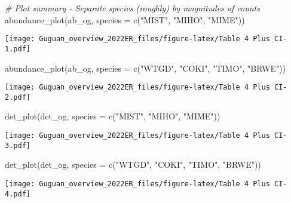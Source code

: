 \documentclass[
]{article}
\newenvironment{Shaded}{\begin{snugshade}}{\end{snugshade}}
\newcommand{\AttributeTok}[1]{\textcolor[rgb]{0.77,0.63,0.00}{#1}}
\newcommand{\CommentTok}[1]{\textcolor[rgb]{0.56,0.35,0.01}{\textit{#1}}}
\newcommand{\FunctionTok}[1]{\textcolor[rgb]{0.00,0.00,0.00}{#1}}
\newcommand{\NormalTok}[1]{#1}
\newcommand{\StringTok}[1]{\textcolor[rgb]{0.31,0.60,0.02}{#1}}
\begin{document}
\begin{Shaded}
\begin{Highlighting}[]
\CommentTok{\# Plot summary {-} Separate species (roughly) by magnitudes of counts}
\FunctionTok{abundance\_plot}\NormalTok{(ab\_og, }\AttributeTok{species =} \FunctionTok{c}\NormalTok{(}\StringTok{"MIST"}\NormalTok{, }\StringTok{"MIHO"}\NormalTok{, }\StringTok{"MIME"}\NormalTok{))}
\end{Highlighting}
\end{Shaded}

\texttt{[image: Guguan\_overview\_2022ER\_files/figure-latex/Table 4 Plus CI-1.pdf]}

\begin{Shaded}
\begin{Highlighting}[]
\FunctionTok{abundance\_plot}\NormalTok{(ab\_og, }\AttributeTok{species =} \FunctionTok{c}\NormalTok{(}\StringTok{"WTGD"}\NormalTok{, }\StringTok{"COKI"}\NormalTok{, }\StringTok{"TIMO"}\NormalTok{, }\StringTok{"BRWE"}\NormalTok{))}
\end{Highlighting}
\end{Shaded}

\texttt{[image: Guguan\_overview\_2022ER\_files/figure-latex/Table 4 Plus CI-2.pdf]}

\begin{Shaded}
\begin{Highlighting}[]
\FunctionTok{det\_plot}\NormalTok{(det\_og, }\AttributeTok{species =} \FunctionTok{c}\NormalTok{(}\StringTok{"MIST"}\NormalTok{, }\StringTok{"MIHO"}\NormalTok{, }\StringTok{"MIME"}\NormalTok{))}
\end{Highlighting}
\end{Shaded}

\texttt{[image: Guguan\_overview\_2022ER\_files/figure-latex/Table 4 Plus CI-3.pdf]}

\begin{Shaded}
\begin{Highlighting}[]
\FunctionTok{det\_plot}\NormalTok{(det\_og, }\AttributeTok{species =} \FunctionTok{c}\NormalTok{(}\StringTok{"WTGD"}\NormalTok{, }\StringTok{"COKI"}\NormalTok{, }\StringTok{"TIMO"}\NormalTok{, }\StringTok{"BRWE"}\NormalTok{))}
\end{Highlighting}
\end{Shaded}

\texttt{[image: Guguan\_overview\_2022ER\_files/figure-latex/Table 4 Plus CI-4.pdf]}
\end{document}
